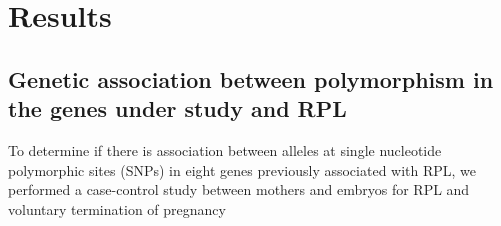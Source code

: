 \documentclass[journal,article,submit,moreauthors,pdftex]{Definitions/mdpi}
\begin{document}
\section{Results}




\subsection{Genetic association between polymorphism in the genes under study and RPL }

\noindent To determine if there is association between alleles at single nucleotide polymorphic sites (SNPs) in eight genes previously associated with RPL, we performed a case-control study between mothers and embryos for RPL and voluntary termination of pregnancy 
\end{document}
